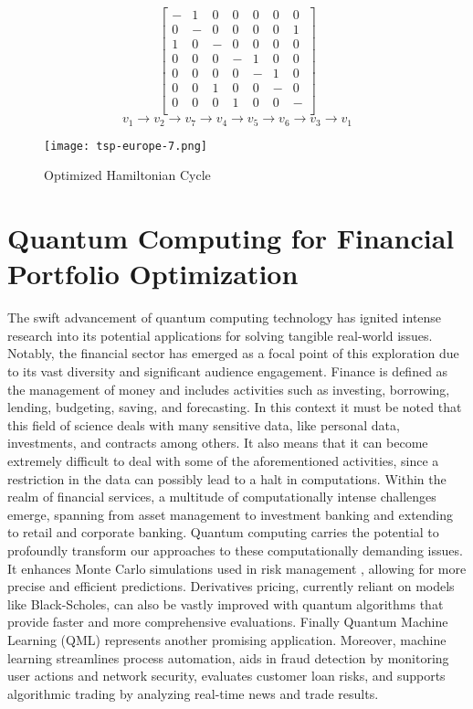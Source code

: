 \documentclass[12pt,a4paper]{report}
\begin{document}
\[
\begin{bmatrix}
- & 1 & 0 & 0 & 0 & 0 & 0 \\
0 & - & 0 & 0 & 0 & 0 & 1 \\
1 & 0 & - & 0 & 0 & 0 & 0 \\
0 & 0 & 0 & - & 1 & 0 & 0 \\
0 & 0 & 0 & 0 & - & 1 & 0 \\
0 & 0 & 1 & 0 & 0 & - & 0 \\
0 & 0 & 0 & 1 & 0 & 0 & - \\
\end{bmatrix}
\]
\[ 
v_1 \to v_2 \to v_7 \to v_4 \to v_5 \to v_6 \to v_3 \to v_1 
\]


\begin{figure}[h]
    \centering
    \texttt{[image: tsp-europe-7.png]}
    \caption{Optimized Hamiltonian Cycle}
    \label{fig:tsp_europe_7}
\end{figure}


\chapter{Quantum Computing for Financial Portfolio Optimization}

The swift advancement of quantum computing technology has ignited intense research into its potential applications for solving tangible real-world issues. Notably, the financial sector has emerged as a focal point of this exploration due to its vast diversity and significant audience engagement. Finance is defined as the management of money and includes activities such as investing, borrowing, lending, budgeting, saving, and forecasting. In this context it must be noted that this field of science deals with many sensitive data, like personal data, investments, and contracts among others. It also means that it can become extremely difficult to deal with some of the aforementioned activities, since a restriction in the data can possibly lead to a halt in computations. Within the realm of financial services, a multitude of computationally intense challenges emerge, spanning from asset management to investment banking and extending to retail and corporate banking. Quantum computing carries the potential to profoundly transform our approaches to these computationally demanding issues. It enhances Monte Carlo simulations \cite{quantum_monte_carlo} used in risk management \cite{risk_management}, allowing for more precise and efficient predictions. Derivatives pricing, currently reliant on models like Black-Scholes, can also be vastly improved with quantum algorithms that provide faster and more comprehensive evaluations. Finally Quantum Machine Learning (QML) \cite{qml} represents another promising application. Moreover, machine learning streamlines process automation, aids in fraud detection by monitoring user actions and network security, evaluates customer loan risks, and supports algorithmic trading by analyzing real-time news and trade results.
\\
\end{document}
